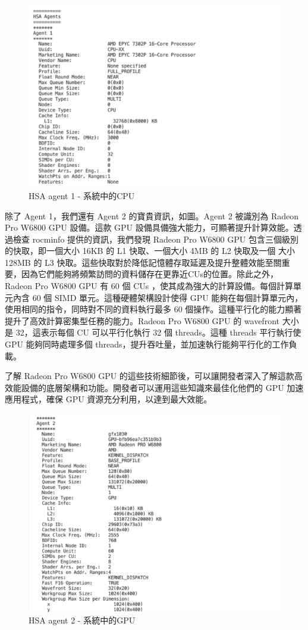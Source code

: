 \begin{figure}
    \centering
    \includegraphics[width=0.75\linewidth]{FileAusiliari/Screenshots/Figure7-2.png}
    \caption{HSA agent 1 - 系統中的CPU}
    \label{fig:HSA agent 1}
\end{figure}

除了 Agent 1，我們還有 Agent 2 的寶貴資訊，如圖。Agent 2 被識別為 Radeon Pro W6800 GPU 設備。這款 GPU 設備具備強大能力，可顯著提升計算效能。透過檢查 rocminfo 提供的資訊，我們發現 Radeon Pro W6800 GPU 包含三個級別的快取，即一個大小 16KB 的 L1 快取、一個大小 4MB 的 L2 快取及一個 大小 128MB 的 L3 快取。這些快取對於降低記憶體存取延遲及提升整體效能至關重要，因為它們能夠將頻繁訪問的資料儲存在更靠近CUs的位置。除此之外，Radeon Pro W6800 GPU 有 60 個 CUs ，使其成為強大的計算設備。每個計算單元內含 60 個 SIMD 單元。這種硬體架構設計使得 GPU 能夠在每個計算單元內，使用相同的指令，同時對不同的資料執行最多 60 個操作。這種平行化的能力顯著提升了高效計算密集型任務的能力。Radeon Pro W6800 GPU 的 wavefront 大小是 32，這表示每個 CU 可以平行化執行 32 個 threads。這種 threads 平行執行使 GPU 能夠同時處理多個 threads，提升吞吐量，並加速執行能夠平行化的工作負載。

了解 Radeon Pro W6800 GPU 的這些技術細節後，可以讓開發者深入了解這款高效能設備的底層架構和功能。開發者可以運用這些知識來最佳化他們的 GPU 加速應用程式，確保 GPU 資源充分利用，以達到最大效能。

\begin{figure}
    \centering
    \includegraphics[width=0.75\linewidth]{FileAusiliari/Screenshots/Figure7-3.png}
    \caption{HSA agent 2 - 系統中的GPU}
    \label{fig:HSA agent 2}
\end{figure}


